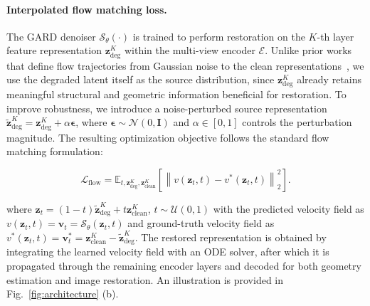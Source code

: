 \paragraph{Interpolated flow matching loss.}
The GARD denoiser $\mathcal{S}_{\theta}(\cdot)$ is trained to perform restoration on the $K$-th layer feature representation $\mathbf{z}_{\text{deg}}^{K}$ within the multi-view encoder $\mathcal{E}$. Unlike prior works that define flow trajectories from Gaussian noise to the clean representations~\cite{zheng2025diffusion, duan2025dit4sr}, we use the degraded latent itself as the source distribution, since $\mathbf{z}_{\text{deg}}^{K}$ already retains meaningful structural and geometric information beneficial for restoration. To improve robustness, we introduce a noise-perturbed source representation $\tilde{\mathbf{z}}_{\text{deg}}^{K} = \mathbf{z}_{\text{deg}}^{K} + \alpha \boldsymbol{\epsilon}$, where $\boldsymbol{\epsilon} \sim \mathcal{N}(0,\mathbf{I})$ and $\alpha \in [0,1]$ controls the perturbation magnitude. The resulting optimization objective follows the standard flow matching formulation:

\begin{equation}
\mathcal{L}_{\text{flow}}
=
\mathbb{E}_{t,
\mathbf{z}_{\text{deg}}^{K},
\mathbf{z}_{\text{clean}}^{K}}
\left[
\left\|
{v}(\mathbf{z}_t,t)
-
{v}^{*}(\mathbf{z}_t,t)
\right\|_2^2
\right].
\end{equation}

where $\mathbf{z}_t = (1-t)\tilde{\mathbf{z}}_{\text{deg}}^{K} + t\mathbf{z}_{\text{clean}}^{K}$, $t \sim \mathcal{U}(0,1)$ with the predicted velocity field as ${v}(\mathbf{z}_t,t) = \mathbf{v}_t = \mathcal{S}_{\theta}(\mathbf{z}_t,t)$ and ground-truth velocity field as ${v}^{*}(\mathbf{z}_t,t) = \mathbf{v}^*_t=\mathbf{z}_{\text{clean}}^{K} - \tilde{\mathbf{z}}_{\text{deg}}^{K}$. The restored representation is obtained by integrating the learned velocity field with an ODE solver, after which it is propagated through the remaining encoder layers and decoded for both geometry estimation and image restoration. An illustration is provided in Fig.~\ref{fig:architecture} (b).





